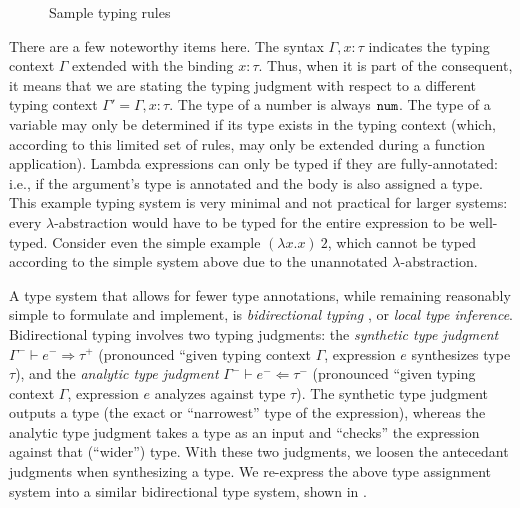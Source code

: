 \begin{figure}
  \centering
  \begin{mdframed}
    \begin{singlespace}
    \end{singlespace}
  \end{mdframed}
  \caption{Sample typing rules}
  \label{fig:sample-typing-rules}
\end{figure}

There are a few noteworthy items here. The syntax $\Gamma,x:\tau$ indicates the typing context $\Gamma$ extended with the binding $x:\tau$. Thus, when it is part of the consequent, it means that we are stating the typing judgment with respect to a different typing context $\Gamma'=\Gamma,x:\tau$. The type of a number is always $\mathtt{num}$. The type of a variable may only be determined if its type exists in the typing context (which, according to this limited set of rules, may only be extended during a function application). Lambda expressions can only be typed if they are fully-annotated: i.e., if the argument's type is annotated and the body is also assigned a type. This example typing system is very minimal and not practical for larger systems: every $\lambda$-abstraction would have to be typed for the entire expression to be well-typed. Consider even the simple example $(\lambda x.x)\ 2$, which cannot be typed according to the simple system above due to the unannotated $\lambda$-abstraction.

A type system that allows for fewer type annotations, while remaining reasonably simple to formulate and implement, is \textit{bidirectional typing} \cite{Dunfield_2022,chlipala2005strict,pierce2000local}, or \textit{local type inference}. Bidirectional typing involves two typing judgments: the \textit{synthetic type judgment} $\Gamma^-\vdash e^-\Rightarrow\tau^+$ (pronounced ``given typing context $\Gamma$, expression $e$ synthesizes type $\tau$), and the \textit{analytic type judgment} $\Gamma^-\vdash e^-\Leftarrow\tau^-$ (pronounced ``given typing context $\Gamma$, expression $e$ analyzes against type $\tau$). The synthetic type judgment outputs a type (the exact or ``narrowest'' type of the expression), whereas the analytic type judgment takes a type as an input and ``checks'' the expression against that (``wider'') type. With these two judgments, we loosen the antecedant judgments when synthesizing a type. We re-express the above type assignment system into a similar bidirectional type system, shown in .

